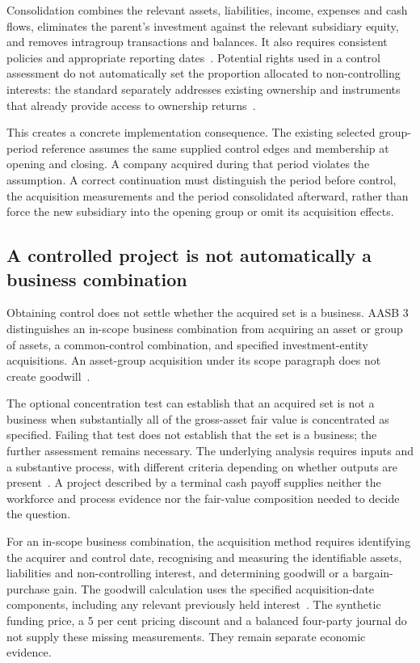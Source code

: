 Consolidation combines the relevant assets, liabilities, income, expenses and cash flows, eliminates the parent's investment against the relevant subsidiary equity, and removes intragroup transactions and balances. It also requires consistent policies and appropriate reporting dates~\citep[paras.~B86--B93]{aasb10control2026}. Potential rights used in a control assessment do not automatically set the proportion allocated to non-controlling interests: the standard separately addresses existing ownership and instruments that already provide access to ownership returns~\citep[paras.~B89--B91]{aasb10control2026}.

This creates a concrete implementation consequence. The existing selected group-period reference assumes the same supplied control edges and membership at opening and closing. A company acquired during that period violates the assumption. A correct continuation must distinguish the period before control, the acquisition measurements and the period consolidated afterward, rather than force the new subsidiary into the opening group or omit its acquisition effects.

\subsection{A controlled project is not automatically a business combination}

Obtaining control does not settle whether the acquired set is a business. AASB 3 distinguishes an in-scope business combination from acquiring an asset or group of assets, a common-control combination, and specified investment-entity acquisitions. An asset-group acquisition under its scope paragraph does not create goodwill~\citep[paras.~2--3]{aasb3scope2026}.

The optional concentration test can establish that an acquired set is not a business when substantially all of the gross-asset fair value is concentrated as specified. Failing that test does not establish that the set is a business; the further assessment remains necessary. The underlying analysis requires inputs and a substantive process, with different criteria depending on whether outputs are present~\citep[paras.~B7A--B12D]{aasb3scope2026}. A project described by a terminal cash payoff supplies neither the workforce and process evidence nor the fair-value composition needed to decide the question.

For an in-scope business combination, the acquisition method requires identifying the acquirer and control date, recognising and measuring the identifiable assets, liabilities and non-controlling interest, and determining goodwill or a bargain-purchase gain. The goodwill calculation uses the specified acquisition-date components, including any relevant previously held interest~\citep[paras.~4--10, 32--33]{aasb3scope2026}. The synthetic funding price, a 5 per cent pricing discount and a balanced four-party journal do not supply these missing measurements. They remain separate economic evidence.


